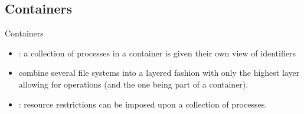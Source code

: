 \subsection{Containers}
\begin{slide}{Containers}
  \begin{centerfig}
  \end{centerfig}

  \begin{itemize}\tightlist
  \item {}: a collection of processes in a container is given their own view of identifiers
  \item {} combine several file systems into a layered fashion with only the highest
    layer allowing for  operations (and the one being part of a container).
  \item {}: resource restrictions can be imposed upon a collection of processes.
  \end{itemize}
\end{slide}
